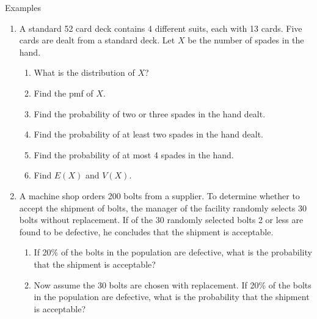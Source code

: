 \documentclass{article}
\begin{document}
Examples\bigskip
\begin{enumerate}
    \item A standard 52 card deck contains 4 different suits, each with 13 cards. Five cards are dealt from a standard deck. Let $X$ be the number of spades in the hand.
    \begin{enumerate}
        \item What is the distribution of $X$?\vspace{30pt}
        \item Find the pmf of $X$.\vspace{50pt}
        \item Find the probability of two or three spades in the hand dealt.\vspace{60pt}
        \item Find the probability of at least two spades in the hand dealt.\vspace{60pt}
        \item Find the probability of at most 4 spades in the hand.\vspace{60pt}
        \item Find $E(X)$ and $V(X)$.\vspace{80pt}
    \end{enumerate}\newpage
    \item A machine shop orders 200 bolts from a supplier. To determine whether to accept the shipment of bolts, the manager of the facility randomly selects 30 bolts without replacement. If of the 30 randomly selected bolts 2 or less are found to be defective, he concludes that the shipment is acceptable.
    \begin{enumerate}
        \item If 20\% of the bolts in the population are defective, what is the probability that the shipment is acceptable?\vspace{70pt}
        \item Now assume the 30 bolts are chosen with replacement. If 20\% of the bolts in the population are defective, what is the probability that the shipment is acceptable?\vspace{70pt}
    \end{enumerate}
\end{enumerate}\bigskip
\end{document}
